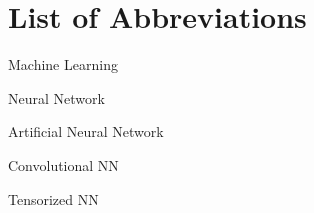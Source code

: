 \section{List of Abbreviations}

\begin{description}[leftmargin=!,labelwidth=2cm]
    \item [ML] Machine Learning
    \item [NN] Neural Network
    \item [ANN] Artificial Neural Network
    \item [CNN] Convolutional NN
    \item [TNN] Tensorized NN

\end{description}